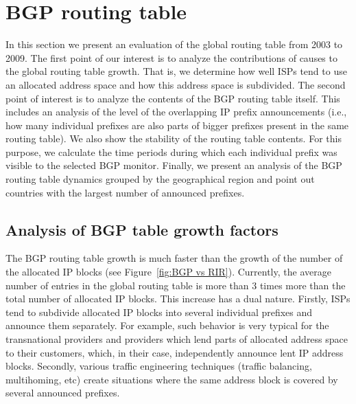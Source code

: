 \section{BGP routing table}
\label{sec:bgp}

In this section we present an evaluation of the global routing table from 2003
to 2009. The first point of our interest is to analyze the contributions of
causes to the global routing table growth. That is, we determine how well ISPs
tend to use an allocated address space and how this address space is
subdivided. The second point of interest is to analyze the contents of the BGP
routing table itself. This includes an analysis of the level of the
overlapping IP prefix announcements (i.e., how many individual prefixes are
also parts of bigger prefixes present in the same routing table). We also show
the stability of the routing table contents. For this purpose, we calculate
the time periods during which each individual prefix was visible to the
selected BGP monitor. Finally, we present an analysis of the BGP routing table
dynamics grouped by the geographical region and point out countries with the
largest number of announced prefixes.

\subsection{Analysis of BGP table growth factors}

The BGP routing table growth is much faster than the growth of the number of
the allocated IP blocks (see Figure~\ref{fig:BGP vs RIR}). Currently, the
average number of entries in the global routing table is more than 3 times
more than the total number of allocated IP blocks. This increase has a dual
nature. Firstly, ISPs tend to subdivide allocated IP blocks into several
individual prefixes and announce them separately. For example, such behavior
is very typical for the transnational providers and providers which lend parts
of allocated address space to their customers, which, in their case,
independently announce lent IP address blocks. Secondly, various traffic
engineering techniques (traffic balancing, multihoming, etc) create situations
where the same address block is covered by several announced prefixes.

